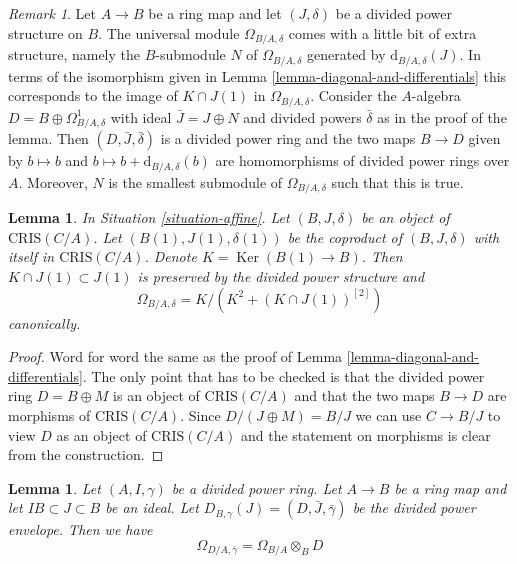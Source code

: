 \documentclass{stacks-project}
\theoremstyle{plain}
\newtheorem{lemma}[subsection]{Lemma}
\theoremstyle{definition}
\theoremstyle{remark}
\newtheorem{remark}[subsection]{Remark}
\numberwithin{equation}{subsection}
\def\Ker{\mathop{\mathrm{Ker}}}
\begin{document}
\begin{remark}
\label{remark-filtration-differentials}
Let $A \to B$ be a ring map and let $(J, \delta)$ be a divided
power structure on $B$. The universal module $\Omega_{B/A, \delta}$
comes with a little bit of extra structure, namely the $B$-submodule
$N$ of $\Omega_{B/A, \delta}$ generated by $\text{d}_{B/A, \delta}(J)$.
In terms of the isomorphism given in
Lemma \ref{lemma-diagonal-and-differentials}
this corresponds to the image of
$K \cap J(1)$ in $\Omega_{B/A, \delta}$. Consider the $A$-algebra
$D = B \oplus \Omega^1_{B/A, \delta}$ with ideal $\bar J = J \oplus N$
and divided powers $\bar \delta$ as in the proof of the lemma.
Then $(D, \bar J, \bar \delta)$ is a divided power ring
and the two maps $B \to D$ given by $b \mapsto b$ and
$b \mapsto b + \text{d}_{B/A, \delta}(b)$
are homomorphisms of divided power rings over $A$. Moreover, $N$
is the smallest submodule of $\Omega_{B/A, \delta}$ such that this is true.
\end{remark}

\begin{lemma}
\label{lemma-diagonal-and-differentials-affine-site}
In Situation \ref{situation-affine}.
Let $(B, J, \delta)$ be an object of $\text{CRIS}(C/A)$.
Let $(B(1), J(1), \delta(1))$ be the coproduct of $(B, J, \delta)$
with itself in $\text{CRIS}(C/A)$. Denote
$K = \Ker(B(1) \to B)$. Then $K \cap J(1) \subset J(1)$
is preserved by the divided power structure and
$$
\Omega_{B/A, \delta} = K/ \left(K^2 + (K \cap J(1))^{[2]}\right)
$$
canonically.
\end{lemma}

\begin{proof}
Word for word the same as the proof of
Lemma \ref{lemma-diagonal-and-differentials}.
The only point that has to be checked is that the
divided power ring $D = B \oplus M$ is an object of $\text{CRIS}(C/A)$
and that the two maps $B \to D$ are morphisms of $\text{CRIS}(C/A)$.
Since $D/(J \oplus M) = B/J$ we can use $C \to B/J$ to view
$D$ as an object of $\text{CRIS}(C/A)$
and the statement on morphisms is clear from the construction.
\end{proof}

\begin{lemma}
\label{lemma-module-differentials-divided-power-envelope}
Let $(A, I, \gamma)$ be a divided power ring. Let $A \to B$ be a ring
map and let $IB \subset J \subset B$ be an ideal. Let
$D_{B, \gamma}(J) = (D, \bar J, \bar \gamma)$ be the divided power envelope.
Then we have
$$
\Omega_{D/A, \bar\gamma} = \Omega_{B/A} \otimes_B D
$$
\end{lemma}
\end{document}
